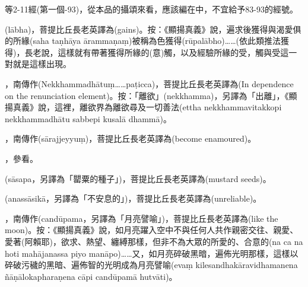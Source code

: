 \startitemgroup[noteitems]
\item{}等2-11經(第一個-93)，從本品的攝頌來看，應該編在中，不宜給予83-93的經號。
\stopitemgroup

\startitemgroup[noteitems]
\item{}(lābha)，菩提比丘長老英譯為(gains)。按：《顯揚真義》說，遍求後獲得與渴愛俱的所緣(saha taṇhāya ārammaṇaṃ)被稱為色獲得(rūpalābho)……(依此類推法獲得)，長老說，這樣就有帶著獲得所緣的(意)觸，以及經驗所緣的受，觸與受這一對就是這樣出現。
\stopitemgroup

\startitemgroup[noteitems]
\item{}，南傳作(Nekkhammadhātuṃ……paṭicca)，菩提比丘長老英譯為(In dependence on the renunciation element)。按：「離欲」(nekkhamma)，另譯為「出離」，《顯揚真義》說，這裡，離欲界為離欲尋及一切善法(ettha nekkhammavitakkopi nekkhammadhātu sabbepi kusalā dhammā)。
\stopitemgroup

\startitemgroup[noteitems]
\item{}，南傳作(sārajjeyyuṃ)，菩提比丘長老英譯為(become enamoured)。
\stopitemgroup

\startitemgroup[noteitems]
\item{}，參看。
\stopitemgroup

\startitemgroup[noteitems]
\item{}(sāsapa，另譯為「罌粟的種子」)，菩提比丘長老英譯為(mustard seeds)。
\stopitemgroup

\startitemgroup[noteitems]
\item{}(anassāsikā，另譯為「不安息的」)，菩提比丘長老英譯為(unreliable)。
\stopitemgroup

\startitemgroup[noteitems]
\item{}，南傳作(candūpama，另譯為「月亮譬喻」)，菩提比丘長老英譯為(like the moon)。按：《顯揚真義》說，如月亮躍入空中不與任何人共作親密交往、親愛、愛著(阿賴耶)，欲求、熱望、纏縛那樣，但非不為大眾的所愛的、合意的(na ca na hoti mahājanassa piyo manāpo)……又，如月亮碎破黑暗，遍佈光明那樣，這樣以碎破污穢的黑暗、遍佈智的光明成為月亮譬喻(evaṃ kilesandhakāravidhamanena ñāṇālokapharaṇena cāpi candūpamā hutvāti)。
\stopitemgroup

